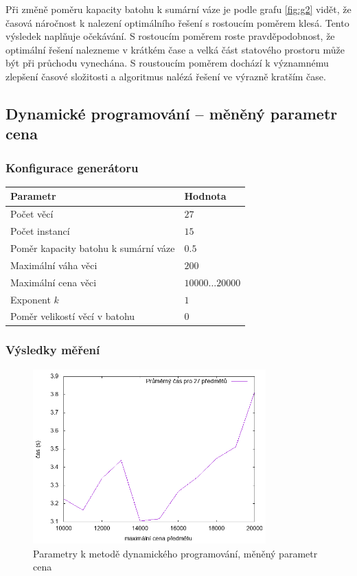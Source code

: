 \documentclass{article}
\begin{document}
Při změně poměru kapacity batohu k sumární váze je podle grafu \ref{fig:g2} vidět, že časová náročnost k nalezení optimálního řešení s rostoucím poměrem klesá.
Tento výsledek naplňuje očekávání.
S rostoucím poměrem roste pravděpodobnost, že optimální řešení nalezneme v krátkém čase a velká část statového prostoru může být při průchodu vynechána.
S roustoucím poměrem dochází k významnému zlepšení časové složitosti a algoritmus nalézá řešení ve výrazně kratším čase.

\subsection{Dynamické programování -- měněný parametr cena}

\subsubsection*{Konfigurace generátoru}

\begin{table}[H]
\centering
    \begin{tabular}{ |l|l| } 
        \hline
        Parametr & Hodnota \\
        \hline
        \hline
        Počet věcí & $27$ \\
        Počet instancí & $15$ \\
        Poměr kapacity batohu k sumární váze & $0.5$ \\
        Maximální váha věci & $200$ \\
        Maximální cena věci & $10000 \dots 20000$ \\
        Exponent $k$ & $1$ \\
        Poměr velikostí věcí v batohu & $0$ \\
        \hline
    \end{tabular}
\end{table}

\subsubsection*{Výsledky měření}

\begin{figure}[H]
    \centering
    \includegraphics[width=0.8\textwidth]{inputs-dp-price/inputs-dp-price.png}
    \caption{Parametry k metodě dynamického programování, měněný parametr cena}
    \label{fig:g3}
\end{figure}
\end{document}
